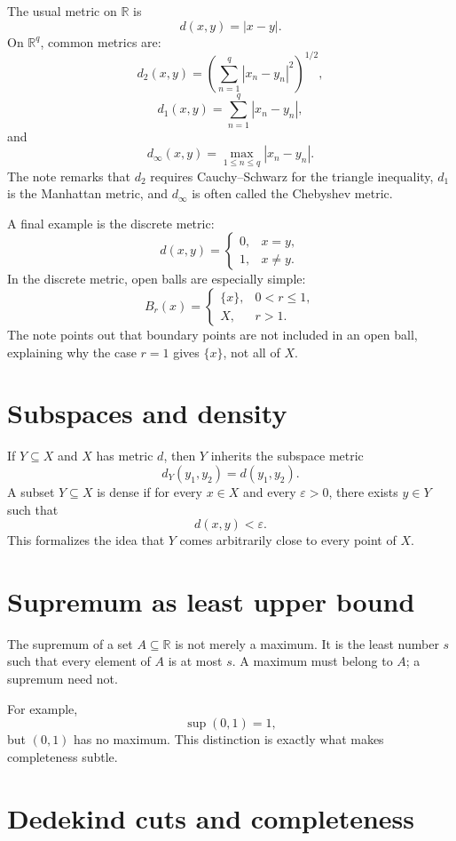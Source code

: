 The usual metric on \(\mathbb R\) is
\[
  d(x,y)=|x-y|.
\]
On \(\mathbb R^q\), common metrics are:
\[
  d_2(x,y)=\left(\sum_{n=1}^q |x_n-y_n|^2\right)^{1/2},
\]
\[
  d_1(x,y)=\sum_{n=1}^q |x_n-y_n|,
\]
and
\[
  d_\infty(x,y)=\max_{1\le n\le q}|x_n-y_n|.
\]
The note remarks that \(d_2\) requires Cauchy--Schwarz for the triangle inequality, \(d_1\) is the Manhattan metric, and \(d_\infty\) is often called the Chebyshev metric.

A final example is the discrete metric:
\[
  d(x,y)=
  \begin{cases}
  0,&x=y,\\
  1,&x\neq y.
  \end{cases}
\]
In the discrete metric, open balls are especially simple:
\[
  B_r(x)=
  \begin{cases}
  \{x\},&0<r\le1,\\
  X,&r>1.
  \end{cases}
\]
The note points out that boundary points are not included in an open ball, explaining why the case \(r=1\) gives \(\{x\}\), not all of \(X\).

\section{Subspaces and density}

If \(Y\subseteq X\) and \(X\) has metric \(d\), then \(Y\) inherits the subspace metric
\[
  d_Y(y_1,y_2)=d(y_1,y_2).
\]
A subset \(Y\subseteq X\) is dense if for every \(x\in X\) and every \(\varepsilon>0\), there exists \(y\in Y\) such that
\[
  d(x,y)<\varepsilon.
\]
This formalizes the idea that \(Y\) comes arbitrarily close to every point of \(X\).


\section{Supremum as least upper bound}

The supremum of a set \(A\subseteq\mathbb R\) is not merely a maximum.  It is the least number \(s\) such that every element of \(A\) is at most \(s\).  A maximum must belong to \(A\); a supremum need not.

For example,
\[
  \sup(0,1)=1,
\]
but \((0,1)\) has no maximum.  This distinction is exactly what makes completeness subtle.

\section{Dedekind cuts and completeness}

